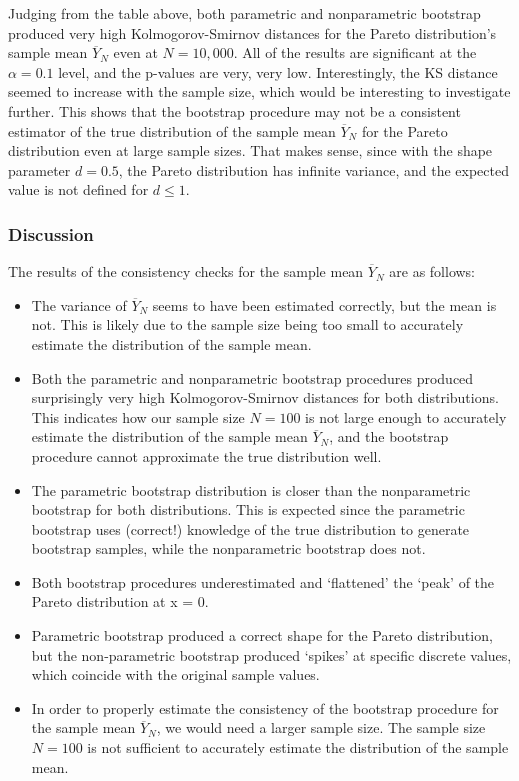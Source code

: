 \documentclass{article}
\begin{document}
Judging from the table above, both parametric and nonparametric bootstrap produced very high Kolmogorov-Smirnov distances for the Pareto distribution's sample mean \(\overline{Y}_N\) even at \(N = 10,000\). All of the results are significant at the \(\alpha = 0.1\) level, and the p-values are very, very low. Interestingly, the KS distance seemed to increase with the sample size, which would be interesting to investigate further. This shows that the bootstrap procedure may not be a consistent estimator of the true distribution of the sample mean \(\overline{Y}_N\) for the Pareto distribution even at large sample sizes. That makes sense, since with the shape parameter \(d = 0.5\), the Pareto distribution has infinite variance, and the expected value is not defined for \(d \le 1\).

\subsubsection{Discussion}

The results of the consistency checks for the sample mean \(\overline{Y}_N\) are as follows:

\begin{itemize}
  \item The variance of \(\overline{Y}_N\) seems to have been estimated correctly, but the mean is not. This is likely due to the sample size being too small to accurately estimate the distribution of the sample mean.
  \item Both the parametric and nonparametric bootstrap procedures produced surprisingly very high Kolmogorov-Smirnov distances for both distributions. This indicates how our sample size \(N = 100\) is not large enough to accurately estimate the distribution of the sample mean \(\overline{Y}_N\), and the bootstrap procedure cannot approximate the true distribution well.
  \item The parametric bootstrap distribution is closer than the nonparametric bootstrap for both distributions. This is expected since the parametric bootstrap uses (correct!) knowledge of the true distribution to generate bootstrap samples, while the nonparametric bootstrap does not.
  \item Both bootstrap procedures underestimated and `flattened' the `peak' of the Pareto distribution at x = 0.
  \item Parametric bootstrap produced a correct shape for the Pareto distribution, but the non-parametric bootstrap produced `spikes' at specific discrete values, which coincide with the original sample values.
  \item In order to properly estimate the consistency of the bootstrap procedure for the sample mean \(\overline{Y}_N\), we would need a larger sample size. The sample size \(N = 100\) is not sufficient to accurately estimate the distribution of the sample mean.
\end{itemize}
\end{document}
